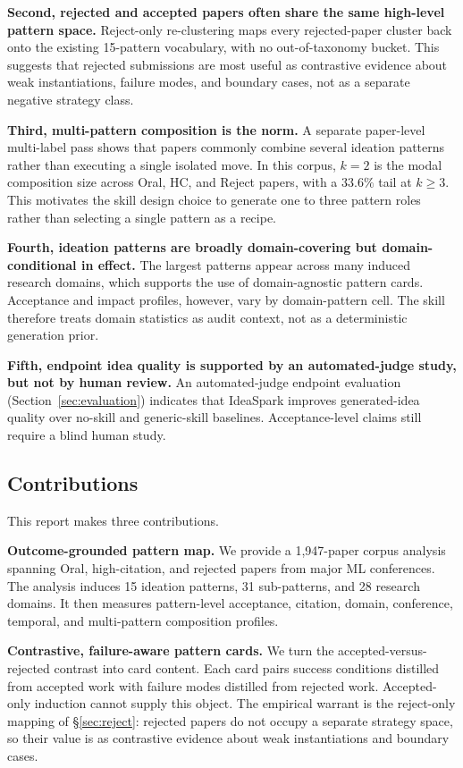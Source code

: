 \documentclass[10pt,a4paper]{article}
\begin{document}
\textbf{Second, rejected and accepted papers often share the same high-level pattern space.} Reject-only re-clustering maps every rejected-paper cluster back onto the existing 15-pattern vocabulary, with no out-of-taxonomy bucket. This suggests that rejected submissions are most useful as contrastive evidence about weak instantiations, failure modes, and boundary cases, not as a separate negative strategy class.

\textbf{Third, multi-pattern composition is the norm.} A separate paper-level multi-label pass shows that papers commonly combine several ideation patterns rather than executing a single isolated move. In this corpus, $k=2$ is the modal composition size across Oral, HC, and Reject papers, with a $33.6\%$ tail at $k \geq 3$. This motivates the skill design choice to generate one to three pattern roles rather than selecting a single pattern as a recipe.

\textbf{Fourth, ideation patterns are broadly domain-covering but domain-conditional in effect.} The largest patterns appear across many induced research domains, which supports the use of domain-agnostic pattern cards. Acceptance and impact profiles, however, vary by domain-pattern cell. The skill therefore treats domain statistics as audit context, not as a deterministic generation prior.

\textbf{Fifth, endpoint idea quality is supported by an automated-judge study, but not by human review.} An automated-judge endpoint evaluation (Section~\ref{sec:evaluation}) indicates that IdeaSpark improves generated-idea quality over no-skill and generic-skill baselines. Acceptance-level claims still require a blind human study.

\subsection{Contributions}

This report makes three contributions.

\textbf{Outcome-grounded pattern map.} We provide a 1{,}947-paper corpus analysis spanning Oral, high-citation, and rejected papers from major ML conferences. The analysis induces 15 ideation patterns, 31 sub-patterns, and 28 research domains. It then measures pattern-level acceptance, citation, domain, conference, temporal, and multi-pattern composition profiles.

\textbf{Contrastive, failure-aware pattern cards.} We turn the accepted-versus-rejected contrast into card content. Each card pairs success conditions distilled from accepted work with failure modes distilled from rejected work. Accepted-only induction cannot supply this object. The empirical warrant is the reject-only mapping of \S\ref{sec:reject}: rejected papers do not occupy a separate strategy space, so their value is as contrastive evidence about weak instantiations and boundary cases.
\end{document}
